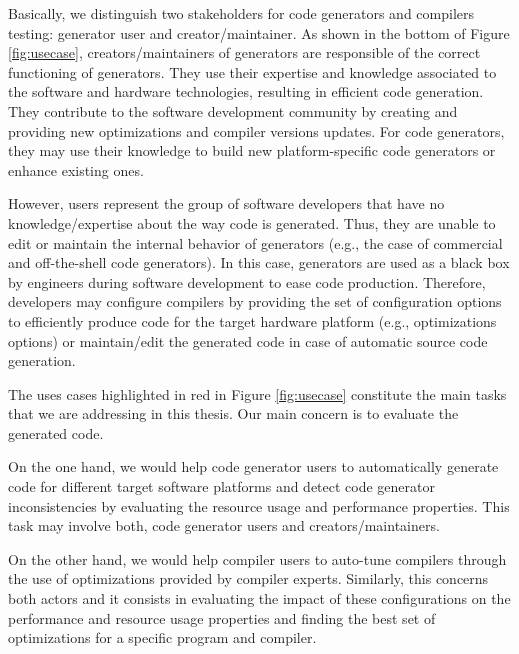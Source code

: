 Basically, we distinguish two stakeholders for code generators and compilers testing: generator user and creator/maintainer. As shown in the bottom of Figure \ref{fig:usecase}, creators/maintainers of generators are responsible of the correct functioning of generators. They use their expertise and knowledge associated to the software and hardware technologies, resulting in efficient code generation. They contribute to the software development community by creating and providing new optimizations and compiler versions updates. For code generators, they may use their knowledge to build new platform-specific code generators or enhance existing ones. 

However, users represent the group of software developers that have no knowledge/expertise about the way code is generated. Thus, they are unable to edit or maintain the internal behavior of generators (e.g., the case of commercial and off-the-shell code generators). In this case, generators are used as a black box by engineers during software development to ease code production. Therefore, developers may configure compilers by providing the set of configuration options to efficiently produce code for the target hardware platform (e.g., optimizations options) or maintain/edit the generated code in case of automatic source code generation.

The uses cases highlighted in red in Figure \ref{fig:usecase} constitute the main tasks that we are addressing in this thesis. Our main concern is to evaluate the generated code.

On the one hand, we would help code generator users to automatically generate code for different target software platforms and detect code generator inconsistencies by evaluating the resource usage and performance properties. This task may involve both, code generator users and creators/maintainers.

On the other hand, we would help compiler users to auto-tune compilers through the use of optimizations provided by compiler experts. Similarly, this concerns both actors and it consists in evaluating the impact of these configurations on the performance and resource usage properties and finding the best set of optimizations for a specific program and compiler.









